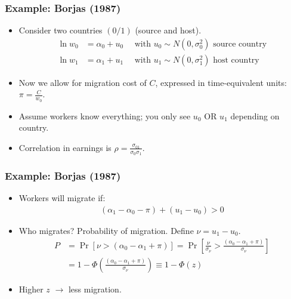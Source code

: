 \documentclass[aspectratio=169,11pt]{beamer}
\begin{document}
\begin{frame}
\frametitle{Example: Borjas (1987)}
\begin{itemize}
\item Consider two countries $(0/1)$ (source and host).
\begin{align*}
\ln w_0 &= \alpha_0 + u_0 \quad \mbox{ with } u_0 \sim N(0,\sigma_0^2) \mbox{ source country}\\
\ln w_1 &= \alpha_1 + u_1 \quad \mbox{ with } u_1 \sim N(0,\sigma_1^2) \mbox{ host country}
\end{align*}
\item Now we allow for migration cost of $C$, expressed in time-equivalent units: $\pi = \frac{C}{w_0}$.
\item Assume workers know everything; you only see $u_0$ \alert{OR} $u_1$ depending on country.
\item Correlation in earnings is $\rho=\frac{\sigma_{01}}{\sigma_{0} \sigma_{1}}$.
\end{itemize}
\end{frame}

\begin{frame}
\frametitle{Example: Borjas (1987)}
\begin{itemize}
\item Workers will migrate if:
\begin{align*}
\left( \alpha_{1}-\alpha_{0}-\pi\right)+\left(u_{1}-u_{0}\right)>0
\end{align*}
\item Who migrates? Probability of migration. Define $\nu = u_1-u_0$.
\begin{align*}
P &=\operatorname{Pr}\left[\nu>\left(\alpha_{0}-\alpha_{1}+\pi\right)\right] =\operatorname{Pr}\left[\frac{\nu}{\sigma_{\nu}}>\frac{\left(\alpha_{0}-\alpha_{1}+\pi\right)}{\sigma_{\nu}}\right] \\
&=1-\Phi\left(\frac{\left(\alpha_{0}-\alpha_{1}+\pi\right)}{\sigma_{\nu}}\right) \equiv 1-\Phi(z)
\end{align*}
\item Higher $z$ $\rightarrow$ less migration.
\end{itemize}
\end{frame}
\end{document}
